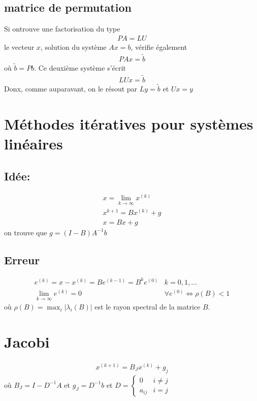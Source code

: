 \subsection{matrice de permutation}
Si ontrouve une factorisation du type
\begin{eqnarray}
	PA = LU
\end{eqnarray}
le vecteur $x$, solution du système $Ax=b$, vérifie également
\begin{eqnarray}
	PAx=\tilde b
\end{eqnarray}
où $\tilde b =Pb$. Ce deuxième système s'écrit
\begin{eqnarray}
	LUx=\tilde b
\end{eqnarray}
Donx, comme auparavant, on le résout par $Ly=\tilde b$ et $Ux=y$
\section{Méthodes itératives pour systèmes linéaires}

\subsection{Idée:}
\begin{eqnarray}
	x=\lim_{k\rightarrow\infty}x^{(k)}
	\\
	x^{k+1}=Bx^{(k)}+g
	\\
	x=Bx+g
\end{eqnarray}
on trouve que $g=(I-B)A^{-1}b$
\subsection{Erreur}
\begin{eqnarray}
	e^{(k)}=x-x^{(k)}=Be^{(k-1)}=B^ke^{(0)}&k=0,1,\dots
	\\
	\lim_{k\rightarrow\infty}e^{(k)}=0&\forall e^{(0)}\Leftrightarrow\rho(B)<1
\end{eqnarray}
où $\rho(B)=\max_i|\lambda_i(B)|$ est le rayon spectral de la matrice $B$.
\section{Jacobi}
\begin{eqnarray}
	x^{(k+1)}=B_Jx^{(k)}+g_j
\end{eqnarray} 
où $B_J=I-D^{-1}A$ et $g_J=D^{-1}b$ et $D=
	\begin{cases}
		0&i\neq j
		\\
		a_{ij}&i=j
	\end{cases}$

